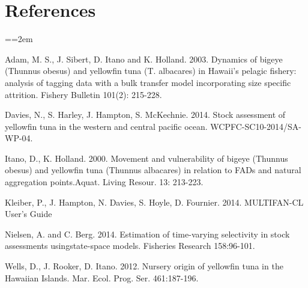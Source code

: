 \documentclass[12pt,letterpaper]{article}
\newcommand\doublespacing{\baselineskip=1.6\normalbaselineskip}
\newcommand\singlespacing{\baselineskip=1.0\normalbaselineskip}
\begin{document}
\singlespacing
\section*{References}
{\parindent=0cm \small
\everypar={\hangindent=2em }\par
\doublespacing
Adam, M. S., J. Sibert, D. Itano and K. Holland. 2003. Dynamics of
bigeye (Thunnus obesus) and yellowfin tuna (T. albacares) in Hawaii's
pelagic fishery: analysis of tagging data with a bulk transfer model
incorporating size specific attrition. Fishery Bulletin 101(2):
215-228.

Davies, N., S. Harley, J. Hampton, S. McKechnie. 2014. Stock
assessment of yellowfin tuna in the western and central pacific ocean.
WCPFC-SC10-2014/SA-WP-04.

Itano, D., K. Holland. 2000.  Movement and vulnerability of bigeye
(Thunnus obesus) and yellowfin tuna (Thunnus albacares) in relation to
FADs and natural aggregation points.Aquat. Living Resour. 13: 213-223.

Kleiber, P., J. Hampton, N. Davies, S. Hoyle, D. Fournier. 2014.
MULTIFAN-CL User’s Guide

Nielsen, A. and C. Berg. 2014. Estimation of time-varying selectivity
in stock assessments usingstate-space models. Fisheries Research
158:96-101.

Wells, D., J. Rooker, D. Itano. 2012.  Nursery origin of yellowfin
tuna in the Hawaiian Islands. Mar. Ecol. Prog. Ser. 461:187-196. 
\par}

\end{document}
